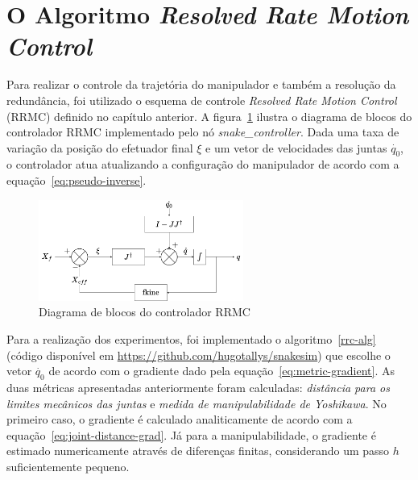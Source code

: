 \section{O Algoritmo \emph{Resolved Rate Motion Control}}

Para realizar o controle da trajetória do manipulador e também a resolução da
redundância, foi utilizado o esquema de controle \emph{Resolved Rate Motion Control} (RRMC)
definido no capítulo anterior. A figura~\ref{fig:block-diagram} ilustra o
diagrama de blocos do controlador RRMC implementado pelo nó
\emph{snake\_controller}. Dada uma taxa de variação da posição do efetuador
final \(\xi\) e um vetor de velocidades das juntas \(\dot{q_0}\), o controlador
atua atualizando a configuração do manipulador de acordo com a
equação~\ref{eq:pseudo-inverse}.

\begin{figure}
    \centering
    \includegraphics[width=0.6\textwidth]{./Images/control-scheme.png}
    \caption{Diagrama de blocos do controlador RRMC}\label{fig:block-diagram}
\end{figure}

Para a realização dos experimentos, foi implementado o algoritmo~\ref{rrc-alg}
(código disponível em \url{https://github.com/hugotallys/snakesim}) que escolhe o vetor \(\dot{q_0}\) de acordo com o gradiente dado pela
equação~\ref{eq:metric-gradient}. As duas métricas apresentadas anteriormente
foram calculadas: \emph{distância para os limites mecânicos das juntas} e
\emph{medida de manipulabilidade de Yoshikawa}. No primeiro caso, o gradiente é
calculado analiticamente de acordo com a equação~\ref{eq:joint-distance-grad}.
Já para a manipulabilidade, o gradiente é estimado numericamente através de
diferenças finitas, considerando um passo \(h\) suficientemente pequeno.

